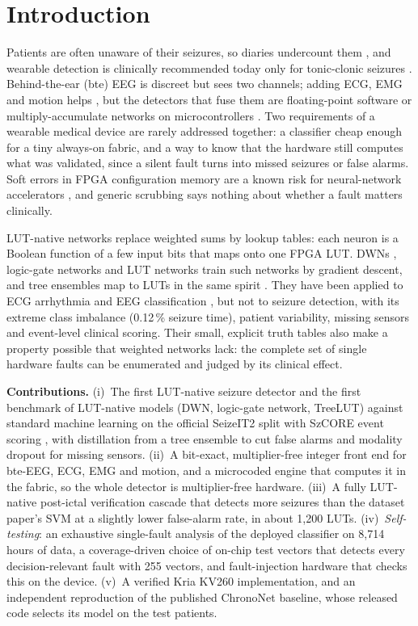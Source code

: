 \documentclass[conference]{IEEEtran}
\begin{document}
\section{Introduction}
Patients are often unaware of their seizures, so diaries undercount them \cite{elger2018underreporting}, and
wearable detection is clinically recommended today only for tonic-clonic seizures \cite{beniczky2021guideline}.
Behind-the-ear (bte) EEG is discreet but sees two channels; adding ECG, EMG and motion helps
\cite{vandecasteele2021ecg,zhang2024tcs}, but the detectors that fuse them are floating-point software or
multiply-accumulate networks on microcontrollers \cite{ingolfsson2024brainfusenet}. Two requirements of a wearable
medical device are rarely addressed together: a classifier cheap enough for a tiny always-on fabric, and a way to
know that the hardware still computes what was validated, since a silent fault turns into missed seizures or false
alarms. Soft errors in FPGA configuration memory are a known risk for neural-network accelerators
\cite{libano2019selective,li2017sc,reagen2018ares}, and generic scrubbing \cite{amd2025pg187} says nothing about
whether a fault matters clinically.

LUT-native networks replace weighted sums by lookup tables: each neuron is a Boolean function of a few input bits that
maps onto one FPGA LUT. DWNs \cite{bacellar2024dwn}, logic-gate networks \cite{petersen2022dlgn} and LUT networks
\cite{umuroglu2020logicnets} train such networks by gradient descent, and tree ensembles map to LUTs in the same spirit
\cite{khataei2025treelut}. They have been applied to ECG arrhythmia \cite{mommen2026ecg} and EEG classification
\cite{dharia2026eeglgn}, but not to seizure detection, with its extreme class imbalance (0.12\,\% seizure time),
patient variability, missing sensors and event-level clinical scoring. Their small, explicit truth tables also make a
property possible that weighted networks lack: the complete set of single hardware faults can be enumerated and
judged by its clinical effect.

\textbf{Contributions.} (i)~The first LUT-native seizure detector and the first benchmark of LUT-native models (DWN,
logic-gate network, TreeLUT) against standard machine learning on the official SeizeIT2 split with SzCORE event
scoring \cite{dan2024szcore}, with distillation from a tree ensemble to cut false alarms and modality dropout for
missing sensors. (ii)~A bit-exact, multiplier-free integer front end for bte-EEG, ECG, EMG and motion, and a
microcoded engine that computes it in the fabric, so the whole detector is multiplier-free hardware. (iii)~A fully
LUT-native post-ictal verification cascade that detects more seizures than the dataset paper's SVM at a slightly lower
false-alarm rate, in about 1,200 LUTs. (iv)~\emph{Self-testing}: an exhaustive single-fault analysis of the deployed
classifier on 8,714 hours of data, a coverage-driven choice of on-chip test vectors that detects every
decision-relevant fault with 255 vectors, and fault-injection hardware that checks this on the device. (v)~A
verified Kria KV260 implementation, and an independent reproduction of the published ChronoNet baseline, whose
released code selects its model on the test patients.
\end{document}
